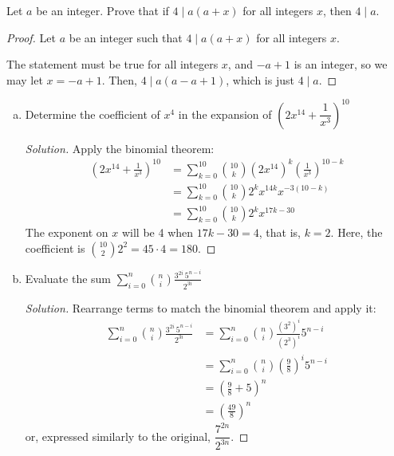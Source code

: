 \question Let $a$ be an integer. Prove that if $4 \mid a(a+x)$ for all integers $x$, then $4 \mid a$.
\begin{proof}
  Let $a$ be an integer such that $4 \mid a(a+x)$ for all integers $x$.

  The statement must be true for all integers $x$, and $-a+1$ is an integer, so we may let $x=-a+1$.
  Then, $4 \mid a(a-a+1)$, which is just $4 \mid a$.
\end{proof}


\question \begin{enumerate}[(a)]
  \item Determine the coefficient of $x^4$ in the expansion of $\left(2x^{14} + \dfrac{1}{x^3}\right)^{10}$
        \begin{proof}[Solution]
          Apply the binomial theorem:
          \begin{align*}
            \left(2x^{14} + \frac{1}{x^3}\right)^{10}
             & = \sum_{k=0}^{10} \binom{10}{k} (2x^{14})^k \left(\frac{1}{x^3}\right)^{10-k} \\
             & = \sum_{k=0}^{10} \binom{10}{k} 2^k x^{14k} x^{-3(10-k)}                      \\
             & = \sum_{k=0}^{10} \binom{10}{k} 2^k x^{17k-30}
          \end{align*}
          The exponent on $x$ will be 4 when $17k-30=4$, that is, $k=2$.
          Here, the coefficient is $\binom{10}{2}2^2 = 45 \cdot 4 = 180$.
        \end{proof}
  \item Evaluate the sum $\displaystyle\sum_{i=0}^n\binom{n}{i}\frac{3^{2i}\,5^{n-i}}{2^{3i}}$
        \begin{proof}[Solution]
          Rearrange terms to match the binomial theorem and apply it:
          \begin{align*}
            \sum_{i=0}^n\binom{n}{i}\frac{3^{2i}\,5^{n-i}}{2^{3i}}
             & = \sum_{i=0}^n\binom{n}{i} \frac{(3^2)^i}{(2^3)^i} 5^{n-i}    \\
             & = \sum_{i=0}^n\binom{n}{i} \left(\frac{9}{8}\right)^i 5^{n-i} \\
             & = \left( \frac{9}{8} + 5 \right)^{n}                          \\
             & = \left( \frac{49}{8} \right)^{n}
          \end{align*}
          or, expressed similarly to the original, $\dfrac{7^{2n}}{2^{3n}}$.
        \end{proof}
\end{enumerate}


